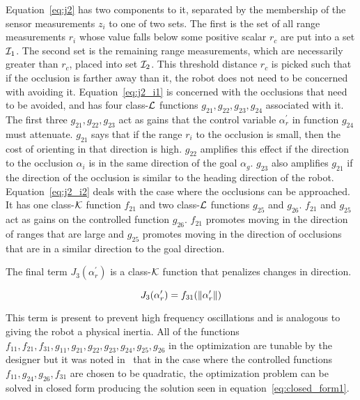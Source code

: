 Equation~\ref{eq:j2} has two components to it, separated by the membership of the sensor measurements $z_i$ to one of two sets. 
The first is the set of all range measurements $r_i$ whose value falls below some positive scalar $r_c$ are put into a set ${\cal I}_1$. 
The second set is the remaining range measurements, which are necessarily greater than $r_c$, placed into set ${\cal I}_2$. 
This threshold distance $r_c$ is picked such that if the occlusion is farther away than it, the robot does not need to be concerned with avoiding it.
Equation~\ref{eq:j2_i1} is concerned with the occlusions that need to be avoided, and has four class-$\cal L$ functions $g_{21}, g_{22}, g_{23}, g_{24}$ 
associated with it. The first three $g_{21}, g_{22}, g_{23}$ act as gains that the control variable $\alpha_r^\prime$ in function $g_{24}$ must attenuate.
$g_{21}$ says that if the range $r_i$ to the occlusion is small, then the cost of orienting in that direction is high.
$g_{22}$ amplifies this effect if the direction to the occlusion $\alpha_i$ is in the same direction of the goal $\alpha_g$.
$g_{23}$ also amplifies $g_{21}$ if the direction of the occlusion is similar to the heading direction of the robot.
Equation~\ref{eq:j2_i2} deals with the case where the occlusions can be approached. It has one class-${\cal K}$ function $f_{21}$ and two
class-${\cal L}$ functions $g_{25}$ and $g_{26}$. $f_{21}$ and $g_{25}$ act as gains on the controlled function $g_{26}$.
$f_{21}$ promotes moving in the direction of ranges that are large and $g_{25}$ promotes moving in the direction of occlusions
that are in a similar direction to the goal direction. 

The final term $J_3(\alpha_r^\prime)$ is a class-${\cal K}$ function that penalizes changes in direction.

\begin{equation}
	J_3(\alpha_r^\prime) = f_{31}(\left\lVert\alpha_r^\prime\right\rVert)
	\label{eq:j3}
\end{equation}

This term is present to prevent high frequency oscillations and is analogous to giving the robot a physical inertia.
All of the functions $f_{11}, f_{21}, f_{31}, g_{11}, g_{21}, g_{22}, g_{23}, g_{24}, g_{25}, g_{26}$ in the optimization are tunable by the designer but
it was noted in~\cite{Krishnamurthy2007} that in the case where the controlled functions $f_{11}, g_{24}, g_{26}, f_{31}$ are 
chosen to be quadratic, the optimization problem can be solved in closed form producing the solution seen in equation~\ref{eq:closed_form1}.

